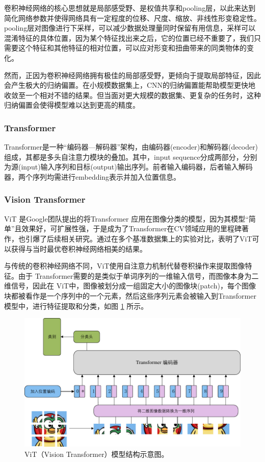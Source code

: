 \documentclass[a4paper]{zreport}
\begin{document}
卷积神经网络的核心思想就是局部感受野、是权值共享和pooling层，以此来达到简化网络参数并使得网络具有一定程度的位移、尺度、缩放、非线性形变稳定性。pooling层对图像进行下采样，可以减少数据处理量同时保留有用信息，采样可以混淆特征的具体位置，因为某个特征找出来之后，它的位置已经不重要了，我们只需要这个特征和其他特征的相对位置，可以应对形变和扭曲带来的同类物体的变化。

然而，正因为卷积神经网络拥有极佳的局部感受野，更倾向于提取局部特征，因此会产生极大的归纳偏置。在小规模数据集上，CNN的归纳偏置能帮助模型更快地收敛至一个相对不错的结果。但当面对更大规模的数据集、更复杂的任务时，这种归纳偏置会使得模型难以达到更高的精度。

\subsubsection{Transformer}

Transformer是一种“编码器—解码器”架构，由编码器(encoder)和解码器(decoder)组成，其都是多头自注意力模块的叠加。其中，input sequence分成两部分，分别为源(input)输入序列和目标(output)输出序列。前者输入编码器，后者输入解码器，两个序列均需进行embedding表示并加入位置信息。


\subsubsection{Vision Transformer}

ViT \cite{dosovitskiy2020image} 是Google团队提出的将Transformer \cite{vaswani2017attention} 应用在图像分类的模型，因为其模型“简单”且效果好，可扩展性强，于是成为了Transformer在CV领域应用的里程碑著作，也引爆了后续相关研究。通过在多个基准数据集上的实验对比，表明了ViT可以获得与当时最优卷积神经网络相美的结果。

与传统的卷积神经网络不同，ViT使用自注意力机制代替卷积操作来提取图像特征。由于 Transformer需要的是类似于单词序列的一维输入信号，而图像本身为二维信号，因此在 ViT中，图像被划分成一组固定大小的图像块(patch)，每个图像块都被看作是一个序列中的一个元素，然后这些序列元素会被输入到Transformer 模型中，进行特征提取和分类，如图 \ref{fig:vit} 所示。

\begin{figure}[h]
\centering
\includegraphics[width=0.9\linewidth]{figures/vit}
\caption{ViT（Vision Transformer）模型结构示意图。}
\label{fig:vit}
\end{figure}
\end{document}
